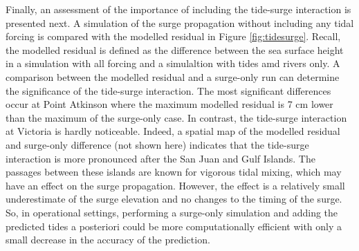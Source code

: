 \documentclass[pdftex,10pt]{article}
\begin{document}

Finally, an assessment of the importance of including the tide-surge interaction is presented next. A simulation of the surge propagation without including any tidal forcing is compared with the modelled residual in Figure \ref{fig:tidesurge}.  Recall, the modelled residual is defined as the difference between the sea surface height in a simulation with all forcing and a simulaltion with tides amd rivers only. A comparison between the modelled residual and a surge-only run can determine the significance of the tide-surge interaction. The most significant differences occur at Point Atkinson where the maximum modelled residual is 7 cm lower than the maximum of the surge-only case.  In contrast, the tide-surge interaction at Victoria is hardly noticeable. Indeed, a spatial map of the modelled residual and surge-only difference (not shown here) indicates that the tide-surge interaction is more pronounced after the San Juan and Gulf Islands. The passages between these islands are known for vigorous tidal mixing, which may have an effect on the surge propagation. However, the effect is a relatively small underestimate of the surge elevation and no changes to the timing of the surge. So, in operational settings, performing a surge-only simulation and adding the predicted tides a posteriori could be more computationally efficient with only a small decrease in the accuracy of the prediction. 
\end{document}
